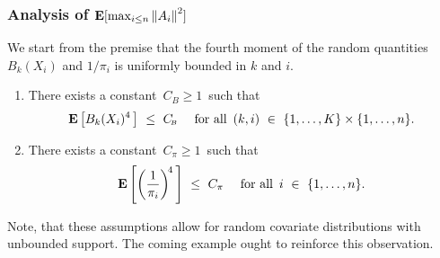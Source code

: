 \subsubsection*{
  Analysis of 
  $
  \mathbf{E}[\max_{i \le n}\left\lVert A_i\right\rVert^2]
  $
}
We start from the premise that the fourth moment of 
the random quantities $B_k(X_i)$ and $1/\pi_i$ is uniformly bounded 
in $k$ and $i$.
\begin{assumptions*}
  \begin{enumerate}[label={(\roman*)}]
    \item
  There exists 
  a constant 
  $
  \,
    C_{\!\scriptscriptstyle B}
  \ge
  1
  \,
  $ such that
  \begin{gather*}
  \E\left[
    B_k(X_i)^{4}
    \,
  \right]
  \ 
  \le
  \ 
    C_{\!\scriptscriptstyle B}
    \quad
    \text{
  for all $\,(k,i)\ \in\  \left\{ 1, \ldots, K \right\}\times \left\{ 1, \ldots, n \right\}$.
    }
  \end{gather*}
  \item
  There exists a constant $\,C_\pi \!\ge 1\,$ such that
  \begin{gather*}
  \E \left[ 
    \left(
      \frac{1}{\pi_{i}}
    \right)^{\!4}
    \,
  \right]
  \ 
  \le
  \ 
  C_\pi
  \quad
  \text{
  for all $\,i\ \in\  \left\{ 1, \ldots, n \right\}$.
  }
  \end{gather*}
  \end{enumerate}
\end{assumptions*}
Note, that these assumptions allow for random covariate distributions with unbounded support. The coming example ought to reinforce this observation.
